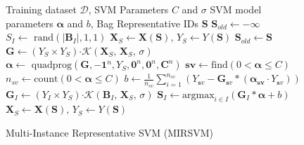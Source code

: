 \documentclass[preprint,12pt]{elsarticle}
\newcommand{\set}[1]{{\left\{#1\right\}}}
\newcommand\tab[1][1cm]{\hspace*{#1}}
\begin{document}
\begin{figure}[tpb!]
\begin{algorithm}[H]
\caption{Multi-Instance Representative SVM (MIRSVM)}
\label{alg:mirsvm} 
\begin{algorithmic}[1]
\renewcommand{\algorithmicrequire}{\textbf{Input:}}
\renewcommand{\algorithmicensure}{\textbf{Output:}}
\Require Training dataset $\mathcal{D}$, SVM Parameters $C$ and $\sigma$
\Ensure  SVM model parameters $\bm \alpha$ and $b$, Bag Representative IDs $\bm S$
\State $\bm S_{old} \leftarrow \bm -\infty$
\For {$I \in \set{1,\ldots,n}$}
\State $S_I \leftarrow \text{ rand}\left(|\bm B_I|,1,1\right)$ 
\EndFor
\State $\bm X_S \leftarrow \bm X(\bm S),\,Y_S \leftarrow Y(\bm S)$ 
\State $\bm S_{old} \leftarrow \bm S$
\State $\bm G \leftarrow (Y_S \times Y_S) \bm \cdot \mathcal{K}\left( \bm X_S,\,\bm X_S,\,\sigma\right)$ 
\State $\bm \alpha \leftarrow \text{ quadprog}\left(\bm G, \bm{-1}^n, Y_S, \bm 0^n, \bm 0^n, \bm C^n\right)$ 
\State $\bm{sv} \leftarrow \text{find}\left(0 < \bm \alpha \leq C \right)$ 
\State $n_{sv} \leftarrow \text{count}\left(0 < \bm \alpha \leq C \right)$ 
\State $b \leftarrow \frac{1}{n_{sv}}\sum_{i=1}^{n_{sv}} \left(Y_{\bm sv} - \bm G_{\bm sv}*\left(\bm{\alpha_{\bm sv}} \cdot Y_{\bm sv}\right)\right)$ 
\For {$I \in \set{1,\ldots,n}$} 
\State $\bm G_I \leftarrow (Y_I \times Y_S) \bm \cdot \mathcal{K}\left( \bm B_I,\,\bm X_S,\,\sigma\right)$
\State $\bm S_I \leftarrow \text{argmax}_{i \in I}\left(\bm G_I*\bm{\alpha} + b \right)$ \tab\tab[0.62cm]
\EndFor
\State $\bm X_S \leftarrow \bm X(\bm S),\,Y_S \leftarrow Y(\bm S)$ 
\EndWhile 
\end{algorithmic} 
\end{algorithm}
\end{figure}
\end{document}

